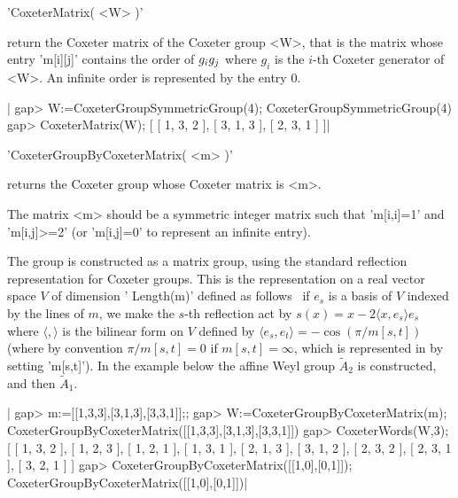 
'CoxeterMatrix( <W> )'

return the Coxeter  matrix of the Coxeter group <W>,  that is the matrix
whose entry  'm[i][j]' contains the  order of $g_i\*g_j$ where  $g_i$ is
the $i$-th Coxeter generator of <W>. An infinite order is represented by
the entry 0.

|    gap> W:=CoxeterGroupSymmetricGroup(4);
    CoxeterGroupSymmetricGroup(4)
    gap> CoxeterMatrix(W);
    [ [ 1, 3, 2 ], [ 3, 1, 3 ], [ 2, 3, 1 ] ]|


'CoxeterGroupByCoxeterMatrix( <m> )'

returns  the  Coxeter  group  whose  Coxeter  matrix  is  <m>.

The  matrix <m> should  be a symmetric  integer matrix such that 'm[i,i]=1'
and 'm[i,j]>=2' (or 'm[i,j]=0' to represent an infinite entry).

The  group is constructed as a  matrix group, using the standard reflection
representation  for Coxeter  groups. This  is the  representation on a real
vector  space $V$ of dimension ' Length(m)' defined as follows \:\ if $e_s$
is  a  basis  of  $V$  indexed  by  the  lines  of  $m$, we make the $s$-th
reflection act by $s(x)=x-2\langle x, e_s\rangle e_s$ where
$\langle,\rangle$   is  the  bilinear  form  on  $V$  defined  by  $\langle
e_s,e_t\rangle=-\cos(\pi/m[s,t])$  (where  by  convention $\pi/m[s,t]=0$ if
$m[s,t]=\infty$,   which   is   represented   in   {\CHEVIE}   by   setting
'm[s,t]').  In the example below the  affine Weyl group $\tilde A_2$ is
constructed, and then $\tilde A_1$.

|    gap> m:=[[1,3,3],[3,1,3],[3,3,1]];;
    gap> W:=CoxeterGroupByCoxeterMatrix(m);
    CoxeterGroupByCoxeterMatrix([[1,3,3],[3,1,3],[3,3,1]])
    gap> CoxeterWords(W,3);
    [ [ 1, 3, 2 ], [ 1, 2, 3 ], [ 1, 2, 1 ], [ 1, 3, 1 ], [ 2, 1, 3 ],
      [ 3, 1, 2 ], [ 2, 3, 2 ], [ 2, 3, 1 ], [ 3, 2, 1 ] ]
    gap> CoxeterGroupByCoxeterMatrix([[1,0],[0,1]]);
    CoxeterGroupByCoxeterMatrix([[1,0],[0,1]])|


